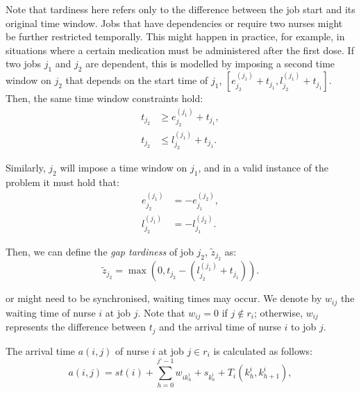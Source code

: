 \documentclass[a4paper,11pt,authoryear]{elsarticle}
\begin{document}
\noindent Note that tardiness here refers only to the difference between the job start and its original time window. Jobs that have dependencies or require two nurses might be further restricted temporally. This might happen in practice, for example, in situations where a certain medication must be administered  after the first dose. If two jobs $j_1$ and $j_2$ are dependent, this is modelled by imposing a second time window on $j_2$ that depends on the start time of $j_1$, $[e^{(j_1)}_{j_2} + t_{j_1}, l^{(j_1)}_{j_2} + t_{j_1}]$. Then, the same time window constraints hold:
\begin{subequations}
	\begin{align}
	t_{j_2} &\geq e^{(j_1)}_{j_2} + t_{j_1}, \label{eqn:timewindow1}\\[3pt] %
	t_{j_2} &\leq l^{(j_1)}_{j_2} + t_{j_1}. \label{eqn:timewindow2} %
	\end{align}
\end{subequations}

\noindent Similarly, $j_2$ will impose a time window on $j_1$, and in a valid instance of the problem it must hold that:
\begin{subequations}
	\begin{align}
	e^{(j_1)}_{j_2} &= -e^{(j_2)}_{j_1}, \label{eqn:earliesttimedependecies}\\[3pt]
	l^{(j_1)}_{j_2} &= -l^{(j_2)}_{j_1}. \label{eqn:latesttimedependencies}
	\end{align}
\end{subequations}

\noindent Then, we can define the \emph{gap tardiness} of job $j_2$, $\tilde{z}_{j_2}$ as:
\begin{equation}
    \tilde{z}_{j_2} = \max(0, t_{j_2} - (l^{(j_1)}_{j_2} + t_{j_1})). \label{eqn:gaptardiness}
\end{equation}

\noindent {} or might need to be synchronised, waiting times may occur. We denote by $w_{ij}$ the waiting time of nurse $i$ at job $j$. Note that $w_{ij} = 0$ if $j \notin r_i$; otherwise, $w_{ij}$ represents the difference between $t_j$ and the arrival time of nurse $i$ to job $j$.%

The arrival time $a(i,j)$ of nurse $i$ at job $j \in r_i$ is calculated as follows:
\begin{equation}
    a(i,j) = st(i) + \sum_{h=0}^{j' - 1} w_{ik^i_h} + s_{k^i_h} + T_i(k^i_h, k^i_{h + 1}),
\end{equation}
\end{document}
